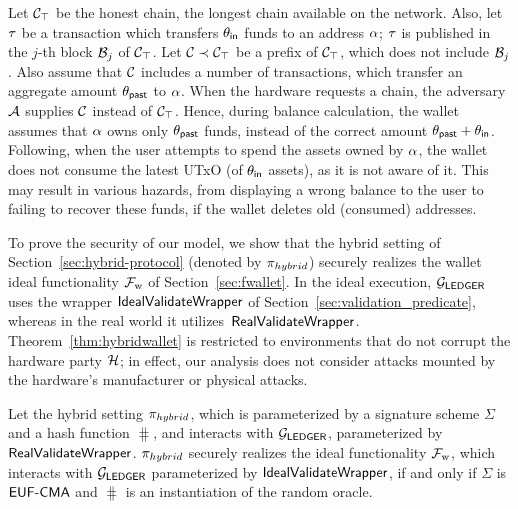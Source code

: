 Let $\mathcal{C}_\top$ be the honest chain, \ie the longest chain available on the
network. Also, let $\tau$ be a transaction which transfers $\theta_\mathsf{in}$
funds to an address $\alpha$; $\tau$ is published in the $j$-th block $\mathcal{B}_j$
of $\mathcal{C}_\top$. Let $\mathcal{C} \prec \mathcal{C}_\top$ be a prefix of $\mathcal{C}_\top$,
which does not include $\mathcal{B}_j$. Also assume that $\mathcal{C}$ includes a number
of transactions, which transfer an aggregate amount $\theta_\mathsf{past}$ to
$\alpha$. When the hardware requests a chain, the adversary $\mathcal{A}$
supplies $\mathcal{C}$ instead of $\mathcal{C}_\top$. Hence, during balance calculation,
the wallet assumes that $\alpha$ owns only $\theta_\mathsf{past}$ funds, instead of
the correct amount $\theta_\mathsf{past} + \theta_\mathsf{in}$. Following, when the
user attempts to spend the assets owned by $\alpha$, the wallet does not consume
the latest UTxO (of $\theta_\mathsf{in}$ assets), as it is not aware of it.  This
may result in various hazards, from displaying a wrong balance to the user to
failing to recover these funds, \eg if the wallet deletes old (\ie consumed)
addresses.

To prove the security of our model, we show that the hybrid setting of
Section~\ref{sec:hybrid-protocol} (denoted by $\pi_{hybrid}$) securely realizes the
wallet ideal functionality $\mathcal{F}_{\mathrm{w}}$ of Section~\ref{sec:fwallet}. In the ideal
execution, $\mathcal{G}_\mathsf{LEDGER}$ uses the wrapper $\mathsf{IdealValidateWrapper}$ of
Section~\ref{sec:validation_predicate}, whereas in the real world it
utilizes~$\mathsf{RealValidateWrapper}$. Theorem~\ref{thm:hybridwallet} is
restricted to environments that do not corrupt the hardware party $\mathcal{H}$;
in effect, our analysis does not consider attacks mounted by the hardware's
manufacturer or physical attacks.

\begin{theorem}\label{thm:hybridwallet}
    Let the hybrid setting $\pi_{hybrid}$, which is parameterized by a signature
    scheme $\Sigma$ and a hash function $\hash$, and interacts
    with $\mathcal{G}_\mathsf{LEDGER}$, parameterized by $\mathsf{RealValidateWrapper}$. $\pi_{hybrid}$
    securely realizes the ideal functionality $\mathcal{F}_{\mathrm{w}}$, which interacts with
    $\mathcal{G}_\mathsf{LEDGER}$ parameterized by $\mathsf{IdealValidateWrapper}$, if and only if
    $\Sigma$ is $\textsf{EUF-CMA}$ and $\hash$ is an instantiation of the random oracle.
\end{theorem}


